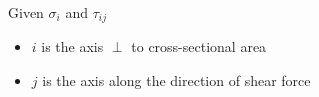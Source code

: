 
Given $\sigma_i$ and $\tau_{ij}$
\begin{itemize}
    \item $i$ is the axis $\perp$ to cross-sectional area
    \item $j$ is the axis along the direction of shear force
\end{itemize}
